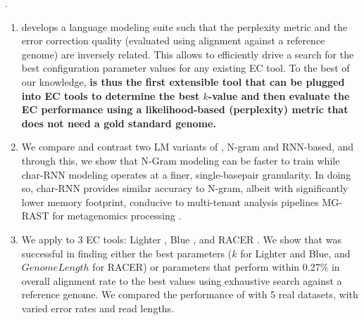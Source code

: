 . 
\vspace{-6pt}
\begin{enumerate}
\item \name develops a language modeling suite such that the perplexity metric and the error correction quality (evaluated using alignment against a reference genome) are inversely related. This allows \name to efficiently drive a search for the best configuration parameter values for any existing EC tool. To the best of our knowledge, \textbf{\name is thus the first extensible tool that can be plugged into EC tools to determine the best $k$-value and then evaluate the EC performance using a likelihood-based (perplexity) metric that does not need a gold standard genome.} 
\vspace{-8pt}

\item We compare and contrast two LM variants of \name, N-gram and RNN-based, and through this, we show that N-Gram modeling can be faster to train while char-RNN modeling operates at a finer, single-basepair granularity. In doing so, char-RNN provides similar accuracy to N-gram, albeit with significantly lower memory footprint, 
conducive to multi-tenant analysis pipelines \eg MG-RAST for metagenomics processing \cite{meyer2017mg}.
\vspace{-8pt}

\item We apply \name to 3 EC tools: Lighter \cite{song2014lighter}, Blue \cite{greenfield2014blue}, and RACER \cite{ilie2013racer}. We show that \name was successful in finding either the best parameters ($k$ for Lighter and Blue, and $Genome Length$ for RACER) or parameters that perform within 0.27\% in overall alignment rate to the best values using exhaustive search against a reference genome. We compared the performance of \name with 5 real datasets, with varied error rates and read lengths. %
\end{enumerate}



